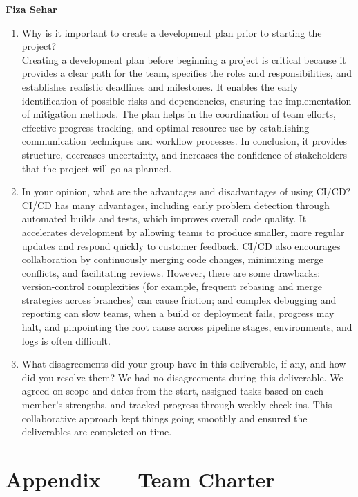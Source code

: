 \documentclass{article}
\begin{document}
\textbf{Fiza Sehar}
\begin{enumerate}

   \item Why is it important to create a development plan prior to starting the
    project? \\[1ex]
	  Creating a development plan before beginning a project is critical because it provides a clear path for the team, specifies the roles and 		responsibilities, and establishes realistic deadlines and milestones.  It enables the early identification of possible risks and dependencies, ensuring the implementation of mitigation methods.  The plan helps in the coordination of team efforts, effective progress tracking, and optimal resource use by establishing communication techniques and workflow processes.  In conclusion, it provides structure, decreases uncertainty, and increases the confidence of stakeholders that the project will go as planned.
	  
    \item In your opinion, what are the advantages and disadvantages of using CI/CD?
    CI/CD has many advantages, including early problem detection through automated builds and tests, which improves overall code quality.  It  accelerates development by allowing teams to produce smaller, more regular updates and respond quickly to customer feedback.  CI/CD also encourages collaboration by continuously merging code changes, minimizing merge conflicts, and facilitating reviews.  However, there are some drawbacks: version-control complexities (for example, frequent rebasing and merge strategies across branches) can cause friction; and complex debugging and reporting can slow teams, when a build or deployment fails, progress may halt, and pinpointing the root cause across pipeline stages, environments, and logs is often difficult.   
	  
    \item What disagreements did your group have in this deliverable, if any,
    and how did you resolve them?
    We had no disagreements during this deliverable.  We agreed on scope and dates from the start, assigned tasks based on each member's strengths, and tracked progress through weekly check-ins.  This collaborative approach kept things going smoothly and ensured the deliverables are completed on time.
\end{enumerate}

\newpage{}

\section*{Appendix --- Team Charter}
\end{document}
